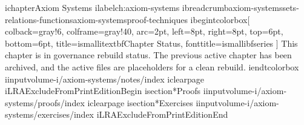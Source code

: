 ichapter{Axiom Systems}
ilabel{ch:axiom-systems}
ibreadcrumb{axiom-systems}{sets-relations-functions}{axiom-systems}{proof-techniques}
ibegin{tcolorbox}[
  colback=gray!6,
  colframe=gray!40,
  arc=2pt,
  left=8pt, right=8pt, top=6pt, bottom=6pt,
  title={ismallitextbf{Chapter Status}},
  fonttitle=ismallibfseries
]
This chapter is in governance rebuild status. The previous active chapter has
been archived, and the active files are placeholders for a clean rebuild.
iend{tcolorbox}
iinput{volume-i/axiom-systems/notes/index}
iclearpage
iLRAExcludeFromPrintEditionBegin
isection*{Proofs}
iinput{volume-i/axiom-systems/proofs/index}
iclearpage
isection*{Exercises}
iinput{volume-i/axiom-systems/exercises/index}
iLRAExcludeFromPrintEditionEnd
